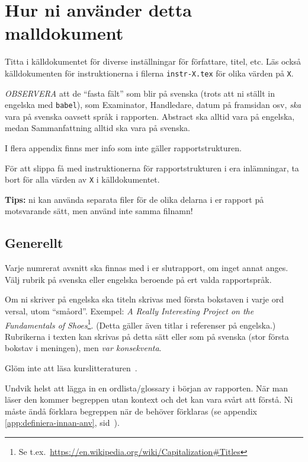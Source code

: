 \section*{Hur ni använder detta malldokument}
Titta i källdokumentet för diverse inställningar för författare, titel, etc. Läs också käll\-doku\-men\-ten för instruktionerna i filerna \verb|instr-X.tex| för olika värden på \verb|X|.

\emph{OBSERVERA} att de ``fasta fält'' som blir på svenska (trots att ni ställt in engelska med \texttt{babel}), som Examinator, Handledare, datum på framsidan osv, \emph{ska} vara på svenska oavsett språk i rapporten. Abstract ska alltid vara på engelska, medan Sammanfattning alltid ska vara på svenska.

I flera appendix finns mer info som inte gäller rapportstrukturen.

För att slippa få med instruktionerna för rapportstrukturen i era inlämningar, ta bort \verb|| för alla värden av \verb|X|
i källdokumentet.

\textbf{Tips:} ni kan använda separata filer för de olika delarna i er rapport på motsvarande sätt, men använd inte samma filnamn!

\subsection*{Generellt}
Varje numrerat avsnitt ska finnas med i er slutrapport, om inget annat anges.  
Välj rubrik på svenska eller engelska beroende på ert valda rapportspråk.

Om ni skriver på engelska ska titeln skrivas med första bokstaven i varje ord versal, utom ``småord''. Exempel: \emph{A Really Interesting Project on the Fundamentals of Shoes}\footnote{Se t.ex.~\url{https://en.wikipedia.org/wiki/Capitalization\#Titles}}.  (Detta gäller även titlar i referenser på engelska.)
Rubrikerna i texten kan skrivas på detta sätt eller som på svenska (stor första bokstav i meningen), men \emph{var konsekventa}.

Glöm inte att läsa kurslitteraturen~\cite{dawson:projects-in-computing,dawson:projects-in-computing-old}.

Undvik helst att lägga in en ordlista/glossary i början av rapporten. När man läser den kommer begreppen utan kontext och det kan vara svårt att förstå. Ni måste ändå förklara begreppen när de behöver förklaras (se appendix \ref{app:definiera-innan-anv}, sid~\pageref{app:definiera-innan-anv}).

